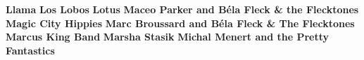 \vspace{10pt} 
\noindent \textbf{Llama}\newline
\vspace{10pt} 
\newline
\vspace{10pt} 
\noindent \textbf{Los Lobos}\newline
\vspace{10pt} 
\newline
\vspace{10pt} 
\noindent \textbf{Lotus}\newline
\vspace{10pt} 
\newline
\vspace{10pt} 
\noindent \textbf{Maceo Parker and B\'ela Fleck \& the Flecktones}\newline
\vspace{10pt} 
\newline
\vspace{10pt} 
\noindent \textbf{Magic City Hippies}\newline
\vspace{10pt} 
\newline
\vspace{10pt} 
\noindent \textbf{Marc Broussard and B\'ela Fleck \& The Flecktones}\newline
\vspace{10pt} 
\newline
\vspace{10pt} 
\noindent \textbf{Marcus King Band}\newline
\vspace{10pt} 
\newline
\vspace{10pt} 
\noindent \textbf{Marsha Stasik}\newline
\vspace{10pt} 
\newline
\vspace{10pt} 
\noindent \textbf{Michal Menert and the Pretty Fantastics}\newline
\vspace{10pt} 
\newline
